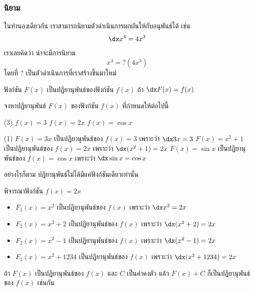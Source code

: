 \begin{frame}
\frametitle{นิยาม}
ในทำนองเดียวกัน เราสามารถนิยามตัวดำเนินการผกผันให้กับอนุพันธ์ได้ เช่น
\[ \dx x^4 = 4x^3 \]
เราเลยคิดว่า น่าจะมีการนิยาม
\[x^4 = ? (4x^3)\]
โดยที่ $?$ เป็นตัวดำเนินการที่เราสร้างขึ้นมาใหม่ 

\begin{defn}{}{}
ฟังก์ชัน $F(x)$ เป็นปฏิยานุพันธ์ของฟังก์ชัน $f(x)$ ถ้า $\dx F(x) = f(x)$  
\end{defn} \pa
\end{frame}


\begin{frame}[t]
\begin{ex}
จงหาปฏิยานุพันธ์ $F(x)$ ของฟังก์ชัน $f(x)$ ที่กำหนดให้ต่อไปนี้
\begin{tasks}(3)
\task $f(x) = 3$ 
\task $f(x) = 2x$ 
\task $f(x) = \cos x$
\end{tasks}
\end{ex}
\begin{sol}
\begin{tasks}(1)
\task $F(x) = 3x$ เป็นปฏิยานุพันธ์ของ $f(x) = 3$ เพราะว่า $\dx 3x = 3$ \pa
\task $F(x) = x^2+1$ เป็นปฏิยานุพันธ์ของ $f(x) = 2x$ เพราะว่า $\dx (x^2+1) = 2x$ \pa
\task $F(x) = \sin x$ เป็นปฏิยานุพันธ์ของ $f(x) = \cos x$ เพราะว่า $\dx \sin x = \cos x$ \pa
\end{tasks}
\end{sol}
\end{frame}

\begin{frame}
อย่างไรก็ตาม ปฏิยานุพันธ์ไม่ได้มีแค่ฟังก์ชันเดียวเท่านั้น \pa

พิจารณาฟังก์ชัน $f(x) = 2x$ \pa
\begin{slide}
\begin{itemize}
\item $F_1(x) = x^2$ เป็นปฏิยานุพันธ์ของ $f(x) $ เพราะว่า $\dx x^2 = 2x$ \pa
\item $F_2(x) = x^2 + 2$ เป็นปฏิยานุพันธ์ของ $f(x)$ เพราะว่า $\dx (x^2+2) = 2x$  \pa
\item $F_2(x) = x^2 -1 $ เป็นปฏิยานุพันธ์ของ $f(x)$ เพราะว่า $\dx (x^2-1) = 2x$ \pa
\item $F_2(x) = x^2 + 1234$ เป็นปฏิยานุพันธ์ของ $f(x)$ เพราะว่า $\dx (x^2+1234) = 2x$ \pa  
\end{itemize}
\end{slide}
\begin{thm}{}{}
ถ้า $F(x)$ เป็นปฏิยานุพันธ์ของ $f(x)$ และ $C$ เป็นค่าคงตัว แล้ว $F(x) + C$ ก็เป็นปฏิยานุพันธ์ของ $f(x)$ เช่นกัน \pa
\end{thm}
\end{frame}

